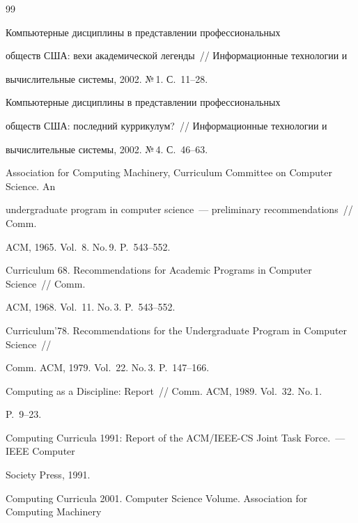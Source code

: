   {\small\frenchspacing

{%


\begin{thebibliography}{99}




 Компьютерные дисциплины в представлении профессиональных 

обществ США: вехи академической легенды~/\!\!/ Информационные технологии и 

вычислительные системы, 2002. №\,1. С.~11--28.


 Компьютерные дисциплины в представлении профессиональных 

обществ США: последний куррикулум?~/\!\!/ Информационные технологии и 

вы\-чис\-ли\-тель\-ные системы, 2002. №\,4. С.~46--63.


Association for Computing Machinery, Curriculum Committee on Computer Science. An 

undergraduate program in computer science~--- preliminary recommendations~/\!\!/ Comm. 

ACM, 1965. Vol.~8. No.\,9. P.~543--552.


Curriculum 68. Recommendations for Academic Programs in Computer Science~/\!\!/ Comm. 

ACM, 1968. Vol.~11. No.\,3. P.~543--552.


Curriculum'78. Recommendations for the Undergraduate Program in Computer Science~/\!\!/ 

Comm. ACM, 1979. Vol.~22. No.\,3. P.~147--166.


Computing as a Discipline: Report~/\!\!/ Comm.  ACM, 1989. Vol.~32. No.\,1. 

P.~9--23.


Computing Curricula 1991: Report of the ACM/IEEE-CS Joint Task Force.~--- IEEE Computer 

Society Press, 1991.


Computing Curricula 2001. Computer Science Volume. Association for Computing Machinery 


\end{thebibliography}}}
